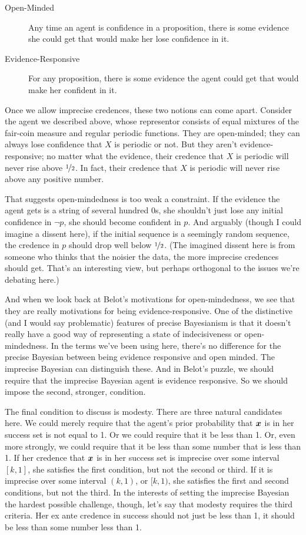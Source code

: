 \begin{description}
\item[Open-Minded] Any time an agent is confidence in a proposition, there is some evidence she could get that would make her lose confidence in it.
\item[Evidence-Responsive] For any proposition, there is some evidence the agent could get that would make her confident in it.
\end{description}
%
Once we allow imprecise credences, these two notions can come apart. Consider the agent we described above, whose representor consists of equal mixtures of the fair-coin measure and regular periodic functions. They are open-minded; they can always lose confidence that $X$ is periodic or not. But they aren't evidence-responsive; no matter what the evidence, their credence that $X$ is periodic will never rise above $\nicefrac{1}{2}$. In fact, their credence that $X$ is periodic will never rise above any positive number. 

That suggests open-mindedness is too weak a constraint. If the evidence the agent gets is a string of several hundred 0s, she shouldn't just lose any initial confidence in $\neg p$, she should become confident in $p$. And arguably (though I could imagine a dissent here), if the initial sequence is a seemingly random sequence, the credence in $p$ should drop well below $\nicefrac{1}{2}$. (The imagined dissent here is from someone who thinks that the noisier the data, the more imprecise credences should get. That's an interesting view, but perhaps orthogonal to the issues we're debating here.)

And when we look back at Belot's motivations for open-mindedness, we see that they are really motivations for being evidence-responsive. One of the distinctive (and I would say problematic) features of precise Bayesianism is that it doesn't really have a good way of representing a state of indecisiveness or open-mindedness. In the terms we've been using here, there's no difference for the precise Bayesian between being evidence responsive and open minded. The imprecise Bayesian can distinguish these. And in Belot's puzzle, we should require that the imprecise Bayesian agent is evidence responsive. So we should impose the second, stronger, condition.

The final condition to discuss is modesty. \label{ModestDef}There are three natural candidates here. We could merely require that the agent's prior probability that $\boldsymbol{x}$ is in her success set is not equal to 1. Or we could require that it be less than 1. Or, even more strongly, we could require that it be less than some number that is less than 1. If her credence that $\boldsymbol{x}$ is in her success set is imprecise over some interval $[k, 1]$, she satisfies the first condition, but not the second or third. If it is imprecise over some interval $(k, 1)$, or $[k, 1)$, she satisfies the first and second conditions, but not the third. In the interests of setting the imprecise Bayesian the hardest possible challenge, though, let's say that modesty requires the third criteria. Her ex ante credence in success should not just be less than 1, it should be less than some number less than 1. 


